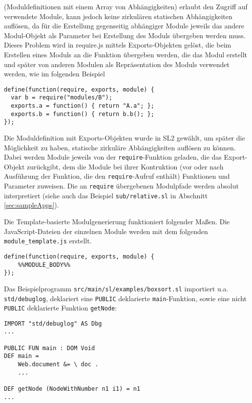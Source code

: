 \documentclass[runningheads]{llncs}
\begin{document}
(Moduldefinitionen mit einem Array von Abhängigkeiten) erlaubt den
Zugriff auf verwendete Module, kann jedoch keine zirkulären
statischen Abhängigkeiten auflösen, da
für die Erstellung gegenseitig abhängiger Module jeweils das
andere Modul-Objekt als Parameter bei Erstellung des Moduls übergeben
werden muss. Dieses Problem wird in require.js mittels
Exports-Objekten gelöst, die beim Erstellen eines Moduls an die Funktion
übergeben werden, die das Modul erstellt und später von anderen Modulen
als Repräsentation des Moduls verwendet werden, wie im folgenden
Beispiel

\begin{verbatim}
define(function(require, exports, module) {
  var b = require("modules/B");
  exports.a = function() { return "A.a"; };
  exports.b = function() { return b.b(); };
});
\end{verbatim}

Die Moduldefinition mit Exports-Objekten wurde in SL2
gewählt, um später die Möglichkeit zu haben, statische zirkuläre
Abhängigkeiten auflösen zu können. Dabei werden Module jeweils von
der \texttt{require}-Funktion geladen, die das Export-Objekt
zurückgibt, dem die Module bei ihrer Kontruktion (vor oder nach
Ausführung der Funktion, die den \texttt{require}-Aufruf enthält)
Funktionen und Parameter zuweisen. Die an \texttt{require} übergebenen
Modulpfade werden absolut interpretiert (siehe auch das Beispiel
\texttt{sub/relative.sl} in Abschnitt \ref{sec:sampleApps}).

Die Template-basierte Modulgenerierung funktioniert folgender Maßen.
Die JavaScript-Dateien der einzelnen Module werden mit dem folgenden
\texttt{module\_template.js} erstellt.

\begin{verbatim}
define(function(require, exports, module) {
    %%MODULE_BODY%%
});
\end{verbatim}

Das Beispielprogramm \texttt{src/main/sl/examples/boxsort.sl}
importiert u.a. \texttt{std/debuglog}, deklariert eine \texttt{PUBLIC}
deklarierte \texttt{main}-Funktion, sowie eine nicht \texttt{PUBLIC}
deklarierte Funktion \texttt{getNode}:

\begin{verbatim}
IMPORT "std/debuglog" AS Dbg
...

PUBLIC FUN main : DOM Void
DEF main = 
	Web.document &= \ doc .
    ...
    
DEF getNode (NodeWithNumber n1 i1) = n1
...
\end{verbatim}
\end{document}
